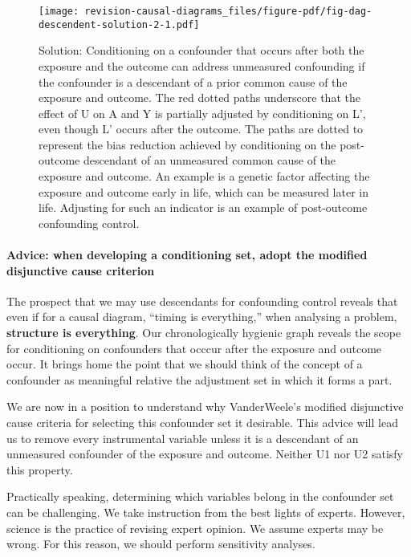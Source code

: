 \documentclass[
  singlecolumn,
  9pt]{article}
\let\oldparagraph\paragraph
\renewcommand{\paragraph}[1]{\oldparagraph{#1}\mbox{}}
\begin{document}
\begin{figure}

{\centering \texttt{[image: revision-causal-diagrams\_files/figure-pdf/fig-dag-descendent-solution-2-1.pdf]}

}

\caption{\label{fig-dag-descendent-solution-2}Solution: Conditioning on
a confounder that occurs after both the exposure and the outcome can
address unmeasured confounding if the confounder is a descendant of a
prior common cause of the exposure and outcome. The red dotted paths
underscore that the effect of U on A and Y is partially adjusted by
conditioning on L', even though L' occurs after the outcome. The paths
are dotted to represent the bias reduction achieved by conditioning on
the post-outcome descendant of an unmeasured common cause of the
exposure and outcome. An example is a genetic factor affecting the
exposure and outcome early in life, which can be measured later in life.
Adjusting for such an indicator is an example of post-outcome
confounding control.}

\end{figure}

\paragraph{Advice: when developing a conditioning set, adopt the
modified disjunctive cause
criterion}\label{advice-when-developing-a-conditioning-set-adopt-the-modified-disjunctive-cause-criterion}

The prospect that we may use descendants for confounding control reveals
that even if for a causal diagram, ``timing is everything,'' when
analysing a problem, \textbf{structure is everything}. Our
chronologically hygienic graph reveals the scope for conditioning on
confounders that occcur after the exposure and outcome occur. It brings
home the point that we should think of the concept of a confounder as
meaningful relative the adjustment set in which it forms a part.

We are now in a position to understand why VanderWeele's modified
disjunctive cause criteria for selecting this confounder set it
desirable. This advice will lead us to remove every instrumental
variable unless it is a descendant of an unmeasured confounder of the
exposure and outcome. Neither U1 nor U2 satisfy this property.

Practically speaking, determining which variables belong in the
confounder set can be challenging. We take instruction from the best
lights of experts. However, science is the practice of revising expert
opinion. We assume experts may be wrong. For this reason, we should
perform sensitivity analyses.
\end{document}

